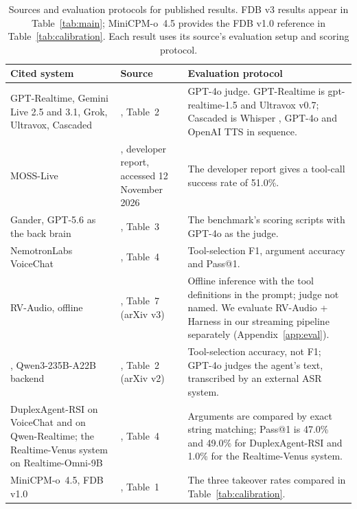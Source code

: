 \begin{table}[tp]
\centering\footnotesize
\setlength{\tabcolsep}{4pt}
\renewcommand{\arraystretch}{1.12}
\begin{tabular}{@{}>{\raggedright\arraybackslash}p{}>{\raggedright\arraybackslash}p{}>{\raggedright\arraybackslash}p{}@{}}
\toprule
\rowcolor{tablehead}Cited system & Source & Evaluation protocol \\
\midrule
GPT-Realtime, Gemini Live 2.5 and 3.1, Grok, Ultravox, Cascaded & \citet{lin2026fdbv3}, Table~2 & GPT-4o judge. GPT-Realtime is gpt-realtime-1.5 and Ultravox v0.7; Cascaded is Whisper \citep{radford2023whisper}, GPT-4o and OpenAI TTS in sequence. \\
MOSS-Live & \citet{mosi2026mosslive}, developer report, accessed 12 November 2026 & The developer report gives a tool-call success rate of 51.0\%. \\
Gander, GPT-5.6 as the back brain & \citet{orantqing2026gander}, Table~3 & The benchmark's scoring scripts with GPT-4o as the judge. \\
NemotronLabs VoiceChat & \citet{nemotronlabs2026voicechat}, Table~4 & Tool-selection F1, argument accuracy and Pass@1. \\
RV-Audio, offline & \citet{venus2026realtimevenus}, Table~7 (arXiv v3) & Offline inference with the tool definitions in the prompt; judge not named. We evaluate RV-Audio + Harness in our streaming pipeline separately (Appendix~\ref{app:eval}). \\
\citeauthor{hu2026frontendbackend}, Qwen3-235B-A22B backend & \citet{hu2026frontendbackend}, Table~2 (arXiv v2) & Tool-selection accuracy, not F1; GPT-4o judges the agent's text, transcribed by an external ASR system. \\
DuplexAgent-RSI on VoiceChat and on Qwen-Realtime; the Realtime-Venus system on Realtime-Omni-9B & \citet{shen2026duplexagentrsi}, Table~4 & Arguments are compared by exact string matching; Pass@1 is 47.0\% and 49.0\% for DuplexAgent-RSI and 1.0\% for the Realtime-Venus system. \\
MiniCPM-o~4.5, FDB v1.0 & \citet{adaptduplex2026}, Table~1 &  The three takeover rates compared in Table~\ref{tab:calibration}. \\
\bottomrule
\end{tabular}
\caption{Sources and evaluation protocols for published results. FDB v3 results appear in Table~\ref{tab:main}; MiniCPM-o~4.5 provides the FDB v1.0 reference in Table~\ref{tab:calibration}. Each result uses its source's evaluation setup and scoring protocol.}
\label{tab:cited}
\end{table}

